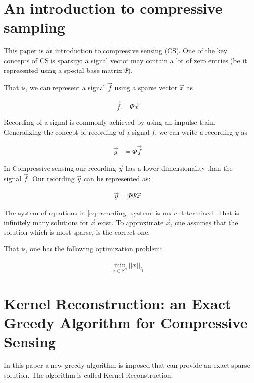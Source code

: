 \documentclass[report, oneside, a4paper, openany]{memoir}
\begin{document}
\section{An introduction to compressive sampling \cite{candes2008introduction}}
This paper is an introduction to compressive sensing (CS). One of the key concepts of CS is sparsity: a signal vector may contain a lot of zero entries (be it represented using a special base matrix $\Psi$).

That is, we can represent a signal $\vec{f}$ using a sparse vector $\vec{x}$ as

\begin{align*}
  \vec{f} = \Psi \vec{x}
\end{align*}

Recording of a signal is commonly achieved by using an impulse train. Generalizing the concept of recording of a signal $f$, we can write a recording $y$ as

\begin{align*}
  \vec{y} &= \Phi \vec{f}
\end{align*}

In Compressive sensing our recording $\vec{y}$ has a lower dimensionality than
the signal $\vec{f}$. Our recording $\vec{y}$ can be represented as:

\begin{align*}\label{eq:recording_system}
  \vec{y} = \Phi \Psi \vec{x}
\end{align*}

The system of equations in \ref{eq:recording_system} is underdetermined. That is
infinitely many solutions for $\vec{x}$ exist. To approximate $\vec{x}$, one assumes that the solution which is most sparse, is the correct one.

That is, one has the following optimization problem:

\begin{align*}
  \min_{x \in \mathbb{R}^n} ||x||_{l_1}
\end{align*}
\section{Kernel Reconstruction: an Exact Greedy Algorithm for Compressive Sensing \cite{bayarkernel}}

In this paper a new greedy algorithm is imposed that can provide an exact sparse solution. The algorithm is called Kernel Reconstruction.
\end{document}
